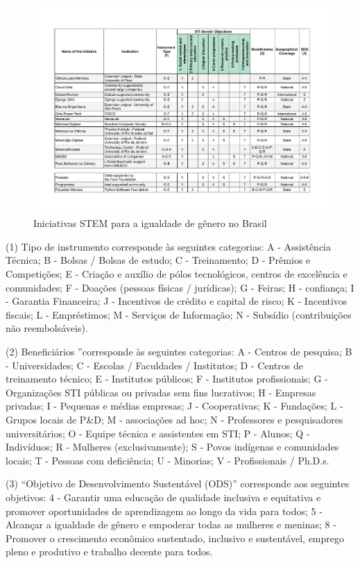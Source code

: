 \begin{figure}
    \centering
    \includegraphics[width=.9\textwidth]{chaps/Images/SAGAMatrixV2.pdf}
    \caption{Iniciativas STEM para a igualdade de gênero no Brasil}
    \label{fig:sagamatriz}
\end{figure}

(1) Tipo de instrumento corresponde às seguintes categorias: A - Assistência Técnica; B - Bolsas / Bolsas de estudo; C - Treinamento; D - Prêmios e Competições; E - Criação e auxílio de pólos tecnológicos, centros de excelência e comunidades; F - Doações (pessoas físicas / jurídicas); G - Feiras; H - confiança; I - Garantia Financeira; J - Incentivos de crédito e capital de risco; K - Incentivos fiscais; L - Empréstimos; M - Serviços de Informação; N - Subsídio (contribuições não reembolsáveis).

(2) Beneficiários ”corresponde às seguintes categorias: A - Centros de pesquisa; B - Universidades; C - Escolas / Faculdades / Institutos; D - Centros de treinamento técnico; E - Institutos públicos; F - Institutos profissionais; G - Organizações STI públicas ou privadas sem fins lucrativos; H - Empresas privadas; I - Pequenas e médias empresas; J - Cooperativas; K - Fundações; L - Grupos locais de P&D; M - associações ad hoc; N - Professores e pesquisadores universitários; O - Equipe técnica e assistentes em STI; P - Alunos; Q - Indivíduos; R - Mulheres (exclusivamente); S - Povos indígenas e comunidades locais; T - Pessoas com deficiência; U - Minorias; V - Profissionais / Ph.D.s.

(3) “Objetivo de Desenvolvimento Sustentável (ODS)” corresponde aos seguintes objetivos: 4 - Garantir uma educação de qualidade inclusiva e equitativa e promover oportunidades de aprendizagem ao longo da vida para todos; 5 - Alcançar a igualdade de gênero e empoderar todas as mulheres e meninas; 8 - Promover o crescimento econômico sustentado, inclusivo e sustentável, emprego pleno e produtivo e trabalho decente para todos.

